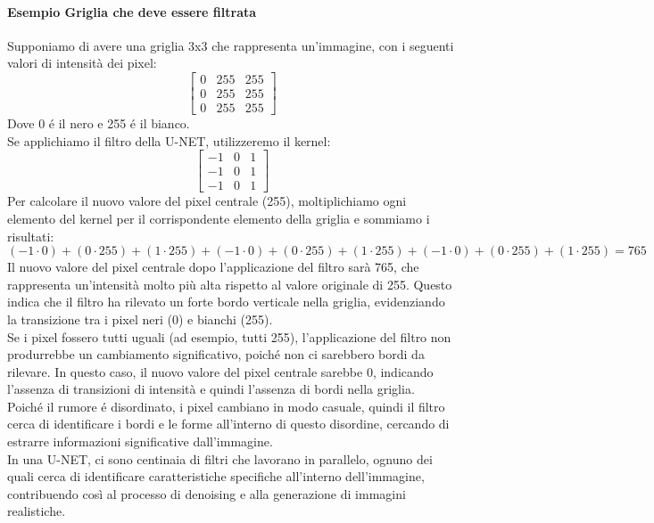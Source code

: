 \paragraph{Esempio Griglia che deve essere filtrata}
Supponiamo di avere una griglia 3x3 che rappresenta un'immagine, con i seguenti valori di intensità dei pixel:
$$\begin{bmatrix}0 & 255 & 255 \\
0 & 255 & 255 \\
0 & 255 & 255\end{bmatrix}$$
Dove 0 é il nero e 255 é il bianco.\\
Se applichiamo il filtro della U-NET, utilizzeremo il kernel:
$$\begin{bmatrix}-1 & 0 & 1 \\
    -1 & 0 & 1 \\
    -1 & 0 & 1\end{bmatrix}$$
Per calcolare il nuovo valore del pixel centrale (255), moltiplichiamo ogni elemento del kernel per il corrispondente elemento della griglia e sommiamo i risultati:
$$(-1 \cdot 0) + (0 \cdot 255) + (1 \cdot 255) + (-1 \cdot 0) + (0 \cdot 255) + (1 \cdot 255) + (-1 \cdot 0) + (0 \cdot 255) + (1 \cdot 255) = 765$$
Il nuovo valore del pixel centrale dopo l'applicazione del filtro sarà 765, che rappresenta un'intensità molto più alta rispetto al valore originale di 255. Questo indica che il filtro ha rilevato un forte bordo verticale nella griglia, evidenziando la transizione tra i pixel neri (0) e bianchi (255).\\

Se i pixel fossero tutti uguali (ad esempio, tutti 255), l'applicazione del filtro non produrrebbe un cambiamento significativo, poiché non ci sarebbero bordi da rilevare. In questo caso, il nuovo valore del pixel centrale sarebbe 0, indicando l'assenza di transizioni di intensità e quindi l'assenza di bordi nella griglia.\\

Poiché il rumore é disordinato, i pixel cambiano in modo casuale, quindi il filtro cerca di identificare i bordi e le forme all'interno di questo disordine, cercando di estrarre informazioni significative dall'immagine.\\

In una U-NET, ci sono centinaia di filtri che lavorano in parallelo, ognuno dei quali cerca di identificare caratteristiche specifiche all'interno dell'immagine, contribuendo così al processo di denoising e alla generazione di immagini realistiche.\\

